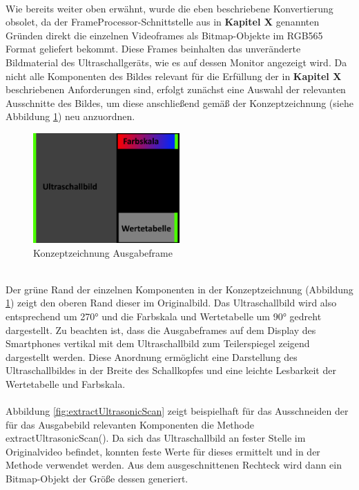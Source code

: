 ~\\
Wie bereits weiter oben erwähnt, wurde die eben beschriebene Konvertierung obsolet, da der FrameProcessor-Schnittstelle aus in \textbf{Kapitel X} genannten Gründen direkt die einzelnen Videoframes als Bitmap-Objekte im RGB565 Format geliefert bekommt. Diese Frames beinhalten das unveränderte Bildmaterial des Ultraschallgeräts, wie es auf dessen Monitor angezeigt wird. Da nicht alle Komponenten des Bildes relevant für die Erfüllung der in \textbf{Kapitel X} beschriebenen Anforderungen sind, erfolgt zunächst eine Auswahl der relevanten Ausschnitte des Bildes, um diese anschließend gemäß der Konzeptzeichnung (siehe Abbildung \ref{fig:Ausgabeframe}) neu anzuordnen. 

\begin{figure}[h]
	\centering
	\includegraphics[width=0.5\textwidth]{Bilder/Bildverarbeitung/Konzept_Endframe.PNG}
	\caption{Konzeptzeichnung Ausgabeframe}
	\label{fig:Ausgabeframe}
\end{figure}

~\\
Der grüne Rand der einzelnen Komponenten in der Konzeptzeichnung (Abbildung \ref{fig:Ausgabeframe}) zeigt den oberen Rand dieser im Originalbild. Das Ultraschallbild wird also entsprechend um 270° und die Farbskala und Wertetabelle um 90° gedreht dargestellt. Zu beachten ist, dass die Ausgabeframes auf dem Display des Smartphones vertikal mit dem Ultraschallbild zum Teilerspiegel zeigend dargestellt werden. Diese Anordnung ermöglicht eine Darstellung des Ultraschallbildes in der Breite des Schallkopfes und eine leichte Lesbarkeit der Wertetabelle und Farbskala.
\\
\\
Abbildung \ref{fig:extractUltrasonicScan} zeigt beispielhaft für das Ausschneiden der für das Ausgabebild relevanten Komponenten die Methode extractUltrasonicScan(). Da sich das Ultraschallbild an fester Stelle im Originalvideo befindet, konnten feste Werte für dieses ermittelt und in der Methode verwendet werden. Aus dem ausgeschnittenen Rechteck wird dann ein Bitmap-Objekt der Größe dessen generiert.


